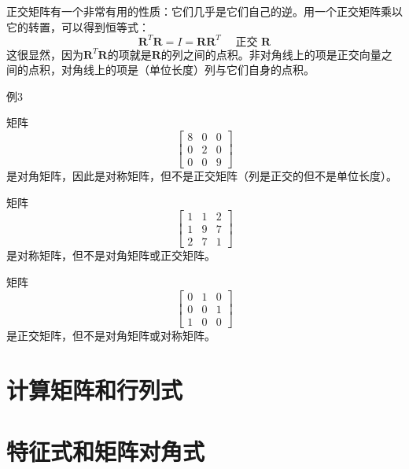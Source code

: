 \documentclass[lang=cn,12pt]{elegantbook}
\begin{document}

正交矩阵有一个非常有用的性质：它们几乎是它们自己的逆。用一个正交矩阵乘以它的转置，可以得到恒等式：$$\mathbf{R}^T \mathbf{R}=I=\mathbf{R} \mathbf{R}^T \quad \text { 正交 } \mathbf{R}$$这很显然，因为$\mathbf{R}^T \mathbf{R}$的项就是$\mathbf{R}$的列之间的点积。非对角线上的项是正交向量之间的点积，对角线上的项是（单位长度）列与它们自身的点积。

例3

矩阵
$$
  \left[\begin{array}{lll}
      8 & 0 & 0 \\
      0 & 2 & 0 \\
      0 & 0 & 9
    \end{array}\right]
$$
是对角矩阵，因此是对称矩阵，但不是正交矩阵（列是正交的但不是单位长度）。

矩阵
$$
  \left[\begin{array}{lll}
      1 & 1 & 2 \\
      1 & 9 & 7 \\
      2 & 7 & 1
    \end{array}\right]
$$是对称矩阵，但不是对角矩阵或正交矩阵。

矩阵
$$
  \left[\begin{array}{lll}
      0 & 1 & 0 \\
      0 & 0 & 1 \\
      1 & 0 & 0
    \end{array}\right]
$$
是正交矩阵，但不是对角矩阵或对称矩阵。

\section{计算矩阵和行列式}
\section{特征式和矩阵对角式}
\end{document}
